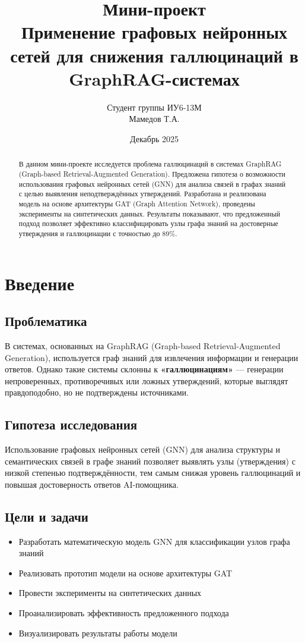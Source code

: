 \documentclass[12pt,a4paper]{article}
\title{Мини-проект \\[0.5cm]
\Large{Применение графовых нейронных сетей для снижения галлюцинаций в GraphRAG-системах}}
\author{Студент группы ИУ6-13М \\ Мамедов Т.А.}
\date{Декабрь 2025}
\begin{document}
\maketitle

\begin{abstract}
В данном мини-проекте исследуется проблема галлюцинаций в системах GraphRAG (Graph-based Retrieval-Augmented Generation). Предложена гипотеза о возможности использования графовых нейронных сетей (GNN) для анализа связей в графах знаний с целью выявления неподтверждённых утверждений. Разработана и реализована модель на основе архитектуры GAT (Graph Attention Network), проведены эксперименты на синтетических данных. Результаты показывают, что предложенный подход позволяет эффективно классифицировать узлы графа знаний на достоверные утверждения и галлюцинации с точностью до 89\%.
\end{abstract}

\tableofcontents

\newpage

\section{Введение}

\subsection{Проблематика}
В системах, основанных на GraphRAG (Graph-based Retrieval-Augmented Generation), используется граф знаний для извлечения информации и генерации ответов. Однако такие системы склонны к \textbf{«галлюцинациям»} — генерации непроверенных, противоречивых или ложных утверждений, которые выглядят правдоподобно, но не подтверждены источниками.

\subsection{Гипотеза исследования}
Использование графовых нейронных сетей (GNN) для анализа структуры и семантических связей в графе знаний позволяет выявлять узлы (утверждения) с низкой степенью подтверждённости, тем самым снижая уровень галлюцинаций и повышая достоверность ответов AI-помощника.

\subsection{Цели и задачи}
\begin{itemize}
    \item Разработать математическую модель GNN для классификации узлов графа знаний
    \item Реализовать прототип модели на основе архитектуры GAT
    \item Провести эксперименты на синтетических данных
    \item Проанализировать эффективность предложенного подхода
    \item Визуализировать результаты работы модели
\end{itemize}
\end{document}
